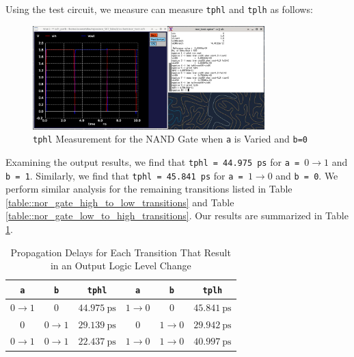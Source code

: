 \documentclass[fleqn]{article}
\begin{document}
	\noindent Using the test circuit, we measure can measure \texttt{tphl} and \texttt{tplh} as follows:
	
	\begin{figure}[H]
		\centerline{\includegraphics[width=0.8\textwidth]{nor_delay_sweep_va.png}}
		\caption{\texttt{tphl} Measurement for the NAND Gate when \texttt{a} is Varied and \texttt{b=0}}
		\label{fig::nor_delay_sweep_va}
	\end{figure}
	
	Examining the output results, we find that \texttt{tphl = 44.975 ps} for \texttt{a = }$0 \rightarrow 1$ and \texttt{b = 1}. Similarly, we find that \texttt{tphl = 45.841 ps} for \texttt{a = }$1 \rightarrow 0$ and \texttt{b = 0}. We perform similar analysis for the remaining transitions listed in Table \ref{table::nor_gate_high_to_low_transitions} and Table \ref{table::nor_gate_low_to_high_transitions}. Our results are summarized in Table \ref{table::nor_gate_delay_analysis}.
	
	\begin{table}[H]
	\begin{center}
	\caption{Propagation Delays for Each Transition That Result in an Output Logic Level Change}
	\label{table::nor_gate_delay_analysis}
	\begin{tabular}{| c | c | c || c | c | c |}
		\hline
		\texttt{a} & \texttt{b} & \texttt{tphl} & \texttt{a} & \texttt{b} & \texttt{tplh} \\
		\hline	
		$0 \rightarrow 1$ & $0$ & $44.975\ \text{ps}$ & $1 \rightarrow 0$ & $0$ & $45.841\ \text{ps}$\\
		\hline	
		$0$ & $0 \rightarrow 1$ & $29.139\ \text{ps}$ & $0$ & $1 \rightarrow 0$ & $29.942\ \text{ps}$\\
		\hline	
		$0 \rightarrow 1$ & $0 \rightarrow 1$ & $22.437\ \text{ps}$ & $1 \rightarrow 0$ & $1 \rightarrow 0$ & $40.997\ \text{ps}$\\
		\hline
	\end{tabular}
	\end{center}
	\end{table}
	
\end{document}
